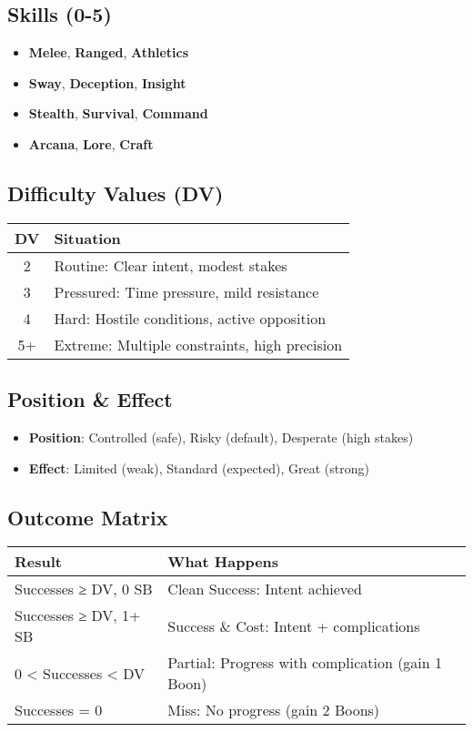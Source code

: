 \documentclass[11pt]{article}
\begin{document}
\subsection{Skills (0-5)}
\begin{itemize}
    \item \textbf{Melee}, \textbf{Ranged}, \textbf{Athletics}
    \item \textbf{Sway}, \textbf{Deception}, \textbf{Insight}
    \item \textbf{Stealth}, \textbf{Survival}, \textbf{Command}
    \item \textbf{Arcana}, \textbf{Lore}, \textbf{Craft}
\end{itemize}

\subsection{Difficulty Values (DV)}
\begin{center}
\begin{tabular}{cl}
\toprule
\textbf{DV} & \textbf{Situation} \\
\midrule
2 & Routine: Clear intent, modest stakes \\
3 & Pressured: Time pressure, mild resistance \\
4 & Hard: Hostile conditions, active opposition \\
5+ & Extreme: Multiple constraints, high precision \\
\bottomrule
\end{tabular}
\end{center}

\subsection{Position \& Effect}
\begin{itemize}
    \item \textbf{Position}: Controlled (safe), Risky (default), Desperate (high stakes)
    \item \textbf{Effect}: Limited (weak), Standard (expected), Great (strong)
\end{itemize}

\subsection{Outcome Matrix}
\begin{center}
\begin{tabular}{ll}
\toprule
\textbf{Result} & \textbf{What Happens} \\
\midrule
Successes ≥ DV, 0 SB & Clean Success: Intent achieved \\
Successes ≥ DV, 1+ SB & Success \& Cost: Intent + complications \\
0 < Successes < DV & Partial: Progress with complication (gain 1 Boon) \\
Successes = 0 & Miss: No progress (gain 2 Boons) \\
\bottomrule
\end{tabular}
\end{center}
\end{document}
